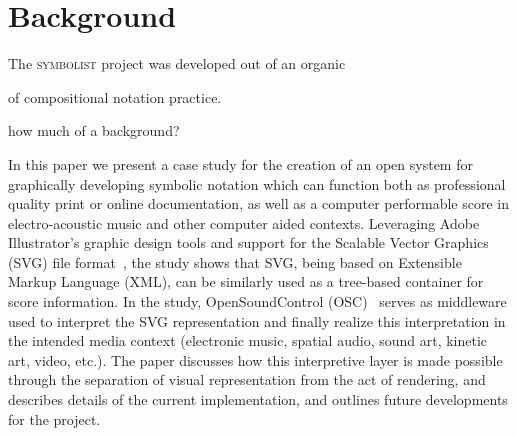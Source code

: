 \documentclass{article}
\title{\papertitle}
\def\symbolist{\textsc{symbolist}\xspace}
\begin{document}
%
\capstartfalse
\maketitle
\capstarttrue


\begin{abstract}

maybe already start with history here, and then continue to symbolist?

  \symbolist is an in-development application for experimental notation, with the goal of creating a working environment for developing symbolic notation for multimedia which can be interpreted and performed by electronics. The program aims to provide an open play space, with tools for experimentation, and thinking visually about relationships between representation and interpretation in media performance. 
In the paper we discuss the evaluation and re-design of the application based on the need for a bi-directional mapping framework for working with symbolic notation and its corresponding data representations.

\end{abstract}



\section{Background}\label{sec:background}


The \symbolist project was developed out of an organic  

of compositional notation practice. 

how much of a background?


In this paper we present a case study for the creation of an open system for graphically developing symbolic notation which can function both as professional quality print or online documentation, as well as a computer performable score in electro-acoustic music and other computer aided contexts. Leveraging Adobe Illustrator’s graphic design tools and support for the Scalable Vector Graphics (SVG) file format~\cite{world2000scalable}, the study shows that SVG, being based on Extensible Markup Language (XML), can be similarly used as a tree-based container for score information. In the study, OpenSoundControl (OSC)~\cite{wright:osc}  serves as middleware used to interpret the SVG representation and finally realize this interpretation in the intended media context (electronic music, spatial audio, sound art, kinetic art, video, etc.). The paper discusses how this interpretive layer is made possible through the separation of visual representation from the act of rendering, and describes details of the current implementation, and outlines future developments for the project.
\end{document}
